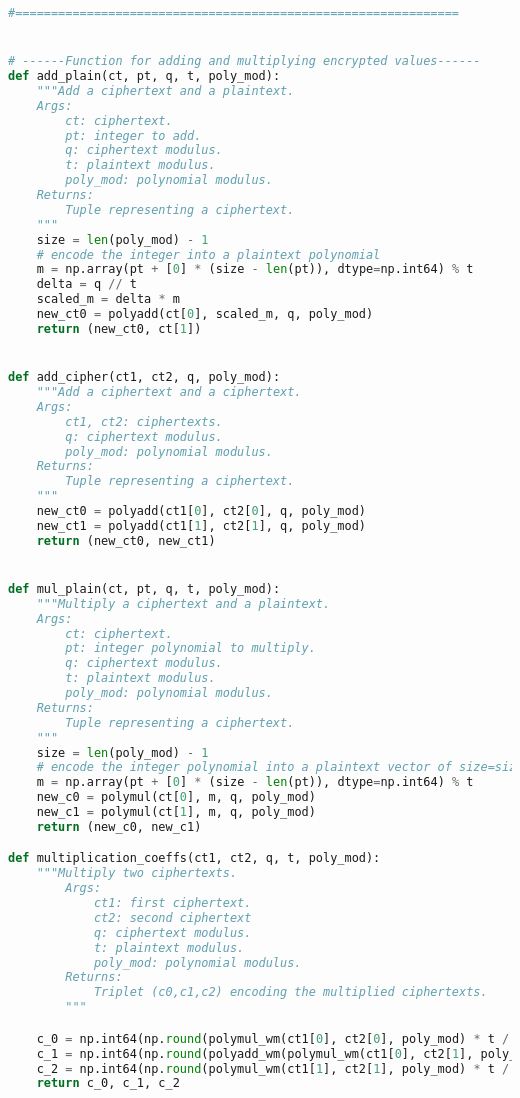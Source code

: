 \documentclass{article}
\begin{document}
\begin{lstlisting}[language=Python]
#==============================================================


# ------Function for adding and multiplying encrypted values------
def add_plain(ct, pt, q, t, poly_mod):
    """Add a ciphertext and a plaintext.
    Args:
        ct: ciphertext.
        pt: integer to add.
        q: ciphertext modulus.
        t: plaintext modulus.
        poly_mod: polynomial modulus.
    Returns:
        Tuple representing a ciphertext.
    """
    size = len(poly_mod) - 1
    # encode the integer into a plaintext polynomial
    m = np.array(pt + [0] * (size - len(pt)), dtype=np.int64) % t
    delta = q // t
    scaled_m = delta * m
    new_ct0 = polyadd(ct[0], scaled_m, q, poly_mod)
    return (new_ct0, ct[1])


def add_cipher(ct1, ct2, q, poly_mod):
    """Add a ciphertext and a ciphertext.
    Args:
        ct1, ct2: ciphertexts.
        q: ciphertext modulus.
        poly_mod: polynomial modulus.
    Returns:
        Tuple representing a ciphertext.
    """
    new_ct0 = polyadd(ct1[0], ct2[0], q, poly_mod)
    new_ct1 = polyadd(ct1[1], ct2[1], q, poly_mod)
    return (new_ct0, new_ct1)


def mul_plain(ct, pt, q, t, poly_mod):
    """Multiply a ciphertext and a plaintext.
    Args:
        ct: ciphertext.
        pt: integer polynomial to multiply.
        q: ciphertext modulus.
        t: plaintext modulus.
        poly_mod: polynomial modulus.
    Returns:
        Tuple representing a ciphertext.
    """
    size = len(poly_mod) - 1
    # encode the integer polynomial into a plaintext vector of size=size
    m = np.array(pt + [0] * (size - len(pt)), dtype=np.int64) % t
    new_c0 = polymul(ct[0], m, q, poly_mod)
    new_c1 = polymul(ct[1], m, q, poly_mod)
    return (new_c0, new_c1)

def multiplication_coeffs(ct1, ct2, q, t, poly_mod):
    """Multiply two ciphertexts.
        Args:
            ct1: first ciphertext.
            ct2: second ciphertext
            q: ciphertext modulus.
            t: plaintext modulus.
            poly_mod: polynomial modulus.
        Returns:
            Triplet (c0,c1,c2) encoding the multiplied ciphertexts.
        """

    c_0 = np.int64(np.round(polymul_wm(ct1[0], ct2[0], poly_mod) * t / q)) % q
    c_1 = np.int64(np.round(polyadd_wm(polymul_wm(ct1[0], ct2[1], poly_mod), polymul_wm(ct1[1], ct2[0], poly_mod), poly_mod) * t / q)) % q
    c_2 = np.int64(np.round(polymul_wm(ct1[1], ct2[1], poly_mod) * t / q)) % q
    return c_0, c_1, c_2



\end{lstlisting}
\end{document}

